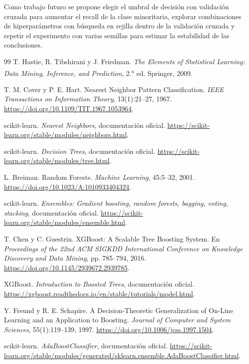 \documentclass[11pt]{article}
\begin{document}
Como trabajo futuro se propone elegir el umbral de decisión con validación cruzada para
aumentar el recall de la clase minoritaria, explorar combinaciones de hiperparámetros con
búsqueda en rejilla dentro de la validación cruzada y repetir el experimento con varias
semillas para estimar la estabilidad de las conclusiones.


\clearpage

\begin{thebibliography}{99}
T. Hastie, R. Tibshirani y J. Friedman. \emph{The Elements of Statistical Learning:
Data Mining, Inference, and Prediction}, 2.\textsuperscript{a} ed. Springer, 2009.

T. M. Cover y P. E. Hart. Nearest Neighbor Pattern Classification.
\emph{IEEE Transactions on Information Theory}, 13(1):21--27, 1967.
\url{https://doi.org/10.1109/TIT.1967.1053964}.

scikit-learn. \emph{Nearest Neighbors}, documentación oficial.
\url{https://scikit-learn.org/stable/modules/neighbors.html}.

scikit-learn. \emph{Decision Trees}, documentación oficial.
\url{https://scikit-learn.org/stable/modules/tree.html}.

L. Breiman. Random Forests. \emph{Machine Learning}, 45:5--32, 2001.
\url{https://doi.org/10.1023/A:1010933404324}.

scikit-learn. \emph{Ensembles: Gradient boosting, random forests, bagging, voting,
stacking}, documentación oficial.
\url{https://scikit-learn.org/stable/modules/ensemble.html}.

T. Chen y C. Guestrin. XGBoost: A Scalable Tree Boosting System. En
\emph{Proceedings of the 22nd ACM SIGKDD International Conference on Knowledge
Discovery and Data Mining}, pp. 785--794, 2016.
\url{https://doi.org/10.1145/2939672.2939785}.

XGBoost. \emph{Introduction to Boosted Trees}, documentación oficial.
\url{https://xgboost.readthedocs.io/en/stable/tutorials/model.html}.

Y. Freund y R. E. Schapire. A Decision-Theoretic Generalization of On-Line Learning
and an Application to Boosting. \emph{Journal of Computer and System Sciences},
55(1):119--139, 1997. \url{https://doi.org/10.1006/jcss.1997.1504}.

scikit-learn. \emph{AdaBoostClassifier}, documentación oficial.
\url{https://scikit-learn.org/stable/modules/generated/sklearn.ensemble.AdaBoostClassifier.html}.


\end{thebibliography}
\end{document}
